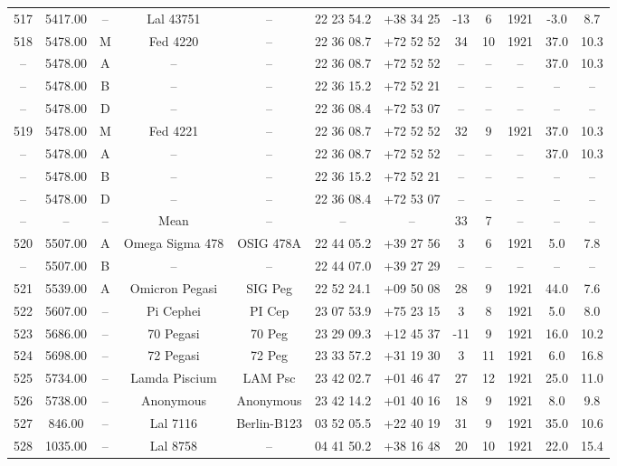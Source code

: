 \begin{table}
\begin{tabular}{cccccccccccc}
517 & 5417.00 & -- & Lal 43751 & -- & 22 23 54.2 & +38 34 25 & -13 & 6 & 1921 & -3.0 & 8.7 \\
518 & 5478.00 & M & Fed 4220 & -- & 22 36 08.7 & +72 52 52 & 34 & 10 & 1921 & 37.0 & 10.3 \\
-- & 5478.00 & A & -- & -- & 22 36 08.7 & +72 52 52 & -- & -- & -- & 37.0 & 10.3 \\
-- & 5478.00 & B & -- & -- & 22 36 15.2 & +72 52 21 & -- & -- & -- & -- & -- \\
-- & 5478.00 & D & -- & -- & 22 36 08.4 & +72 53 07 & -- & -- & -- & -- & -- \\
519 & 5478.00 & M & Fed 4221 & -- & 22 36 08.7 & +72 52 52 & 32 & 9 & 1921 & 37.0 & 10.3 \\
-- & 5478.00 & A & -- & -- & 22 36 08.7 & +72 52 52 & -- & -- & -- & 37.0 & 10.3 \\
-- & 5478.00 & B & -- & -- & 22 36 15.2 & +72 52 21 & -- & -- & -- & -- & -- \\
-- & 5478.00 & D & -- & -- & 22 36 08.4 & +72 53 07 & -- & -- & -- & -- & -- \\
-- & -- & -- & Mean & -- & -- & -- & 33 & 7 & -- & -- & -- \\
520 & 5507.00 & A & Omega Sigma 478 & OSIG 478A & 22 44 05.2 & +39 27 56 & 3 & 6 & 1921 & 5.0 & 7.8 \\
-- & 5507.00 & B & -- & -- & 22 44 07.0 & +39 27 29 & -- & -- & -- & -- & -- \\
521 & 5539.00 & A & Omicron Pegasi & SIG Peg & 22 52 24.1 & +09 50 08 & 28 & 9 & 1921 & 44.0 & 7.6 \\
522 & 5607.00 & -- & Pi Cephei & PI Cep & 23 07 53.9 & +75 23 15 & 3 & 8 & 1921 & 5.0 & 8.0 \\
523 & 5686.00 & -- & 70 Pegasi & 70 Peg & 23 29 09.3 & +12 45 37 & -11 & 9 & 1921 & 16.0 & 10.2 \\
524 & 5698.00 & -- & 72 Pegasi & 72 Peg & 23 33 57.2 & +31 19 30 & 3 & 11 & 1921 & 6.0 & 16.8 \\
525 & 5734.00 & -- & Lamda Piscium & LAM Psc & 23 42 02.7 & +01 46 47 & 27 & 12 & 1921 & 25.0 & 11.0 \\
526 & 5738.00 & -- & Anonymous & Anonymous & 23 42 14.2 & +01 40 16 & 18 & 9 & 1921 & 8.0 & 9.8 \\
527 & 846.00 & -- & Lal 7116 & Berlin-B123 & 03 52 05.5 & +22 40 19 & 31 & 9 & 1921 & 35.0 & 10.6 \\
528 & 1035.00 & -- & Lal 8758 & -- & 04 41 50.2 & +38 16 48 & 20 & 10 & 1921 & 22.0 & 15.4 \\

\end{tabular}
\end{table}
